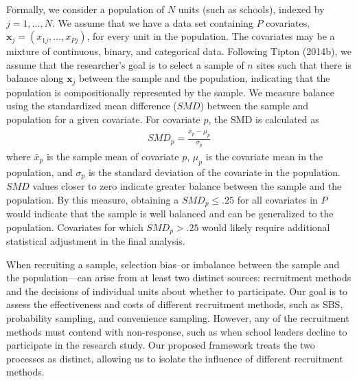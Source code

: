 \documentclass[
  english,
  man,floatsintext]{apa6}
\begin{document}
Formally, we consider a population of \(N\) units (such as schools), indexed by \(j = 1,...,N\).
We assume that we have a data set containing \(P\) covariates, \(\mathbf{x}_j = \left(x_{1j},...,x_{Pj}\right)\), for every unit in the population. The covariates may be a mixture of continuous, binary, and categorical data.
Following Tipton (2014b), we assume that the researcher's goal is to select a sample of \(n\) sites such that there is balance along \(\mathbf{x}_j\) between the sample and the population, indicating that the population is compositionally represented by the sample.
We measure balance using the standardized mean difference (\(SMD\)) between the sample and population for a given covariate. For covariate \(p\), the SMD is calculated as
\begin{align} \label{eq:SMD}
SMD_p = \frac{\bar{x}_p - \mu_p}{\sigma_p}
\end{align}
where \(\bar{x}_p\) is the sample mean of covariate \(p\), \(\mu_p\) is the covariate mean in the population, and \(\sigma_p\) is the standard deviation of the covariate in the population. \(SMD\) values closer to zero indicate greater balance between the sample and the population. By this measure, obtaining a \(SMD_p \le .25\) for all covariates in \(P\) would indicate that the sample is well balanced and can be generalized to the population. Covariates for which \(SMD_p > .25\) would likely require additional statistical adjustment in the final analysis.

When recruiting a sample, selection bias--or imbalance between the sample and the population---can arise from at least two distinct sources: recruitment methods and the decisions of individual units about whether to participate. Our goal is to assess the effectiveness and costs of different recruitment methods, such as SBS, probability sampling, and convenience sampling. However, any of the recruitment methods must contend with non-response, such as when school leaders decline to participate in the research study.
Our proposed framework treats the two processes as distinct, allowing us to isolate the influence of different recruitment methods.
\end{document}
